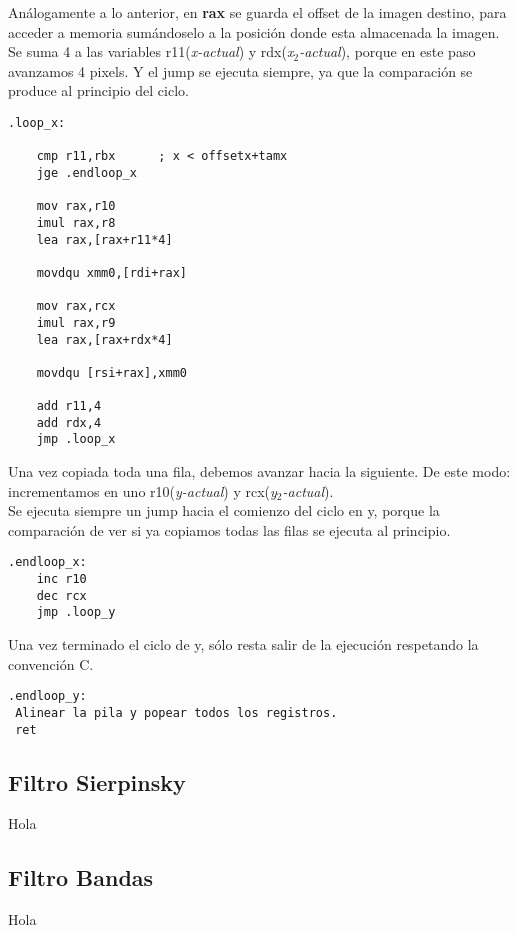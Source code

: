 \documentclass[a4paper]{article}
\begin{document}
\indent An\'alogamente a lo anterior, en \textbf{rax} se guarda el offset de la imagen destino, para acceder a memoria sum\'andoselo a la posici\'on donde esta almacenada la imagen. \\
\indent Se suma 4 a las variables r11(\emph{x-actual}) y rdx(\emph{x$_2$-actual}), porque en este paso avanzamos 4 pixels. Y el jump se ejecuta siempre, ya que la comparaci\'on se produce al principio del ciclo.
	  \begin{codesnippet}
\begin{verbatim}
.loop_x:

	cmp r11,rbx      ; x < offsetx+tamx
	jge .endloop_x

	mov rax,r10
	imul rax,r8
	lea rax,[rax+r11*4]

	movdqu xmm0,[rdi+rax]

	mov rax,rcx
	imul rax,r9
	lea rax,[rax+rdx*4]

	movdqu [rsi+rax],xmm0

	add r11,4
	add rdx,4
	jmp .loop_x	
\end{verbatim}
\end{codesnippet}

\indent Una vez copiada toda una fila, debemos avanzar hacia la siguiente. De este modo: incrementamos en uno r10(\emph{y-actual}) y rcx(\emph{y$_2$-actual}). \\
\indent Se ejecuta siempre un jump hacia el comienzo del ciclo en y, porque la comparaci\'on de ver si ya copiamos todas las filas se ejecuta al principio.
	  \begin{codesnippet}
\begin{verbatim}
.endloop_x:
	inc r10
	dec rcx
	jmp .loop_y
\end{verbatim}
\end{codesnippet}

\indent Una vez terminado el ciclo de y, s\'olo resta salir de la ejecuci\'on respetando la convenci\'on C.
	  \begin{codesnippet}
\begin{verbatim}
.endloop_y:
 Alinear la pila y popear todos los registros.
 ret
\end{verbatim}
\end{codesnippet}

\newpage
\subsection{Filtro Sierpinsky}
Hola
\newpage
\subsection{Filtro Bandas}
Hola
\newpage
\end{document}
